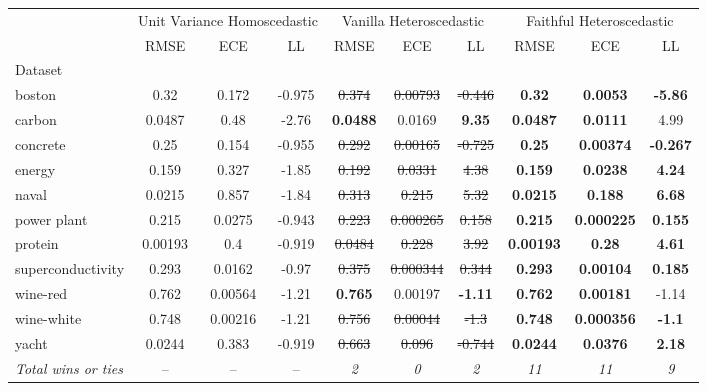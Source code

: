 \begin{tabular}{l|ccc|ccc|ccc}
\toprule
 & \multicolumn{3}{|c}{Unit Variance Homoscedastic} & \multicolumn{3}{|c}{Vanilla Heteroscedastic} & \multicolumn{3}{|c}{Faithful Heteroscedastic} \\
 & RMSE & ECE & LL & RMSE & ECE & LL & RMSE & ECE & LL \\
Dataset &  &  &  &  &  &  &  &  &  \\
\midrule
boston & 0.32 & 0.172 & -0.975 & \sout{0.374} & \sout{0.00793} & \sout{-0.446} & \textbf{0.32} & \textbf{0.0053} & \textbf{-5.86} \\
carbon & 0.0487 & 0.48 & -2.76 & \textbf{0.0488} & 0.0169 & \textbf{9.35} & \textbf{0.0487} & \textbf{0.0111} & 4.99 \\
concrete & 0.25 & 0.154 & -0.955 & \sout{0.292} & \sout{0.00165} & \sout{-0.725} & \textbf{0.25} & \textbf{0.00374} & \textbf{-0.267} \\
energy & 0.159 & 0.327 & -1.85 & \sout{0.192} & \sout{0.0331} & \sout{4.38} & \textbf{0.159} & \textbf{0.0238} & \textbf{4.24} \\
naval & 0.0215 & 0.857 & -1.84 & \sout{0.313} & \sout{0.215} & \sout{5.32} & \textbf{0.0215} & \textbf{0.188} & \textbf{6.68} \\
power plant & 0.215 & 0.0275 & -0.943 & \sout{0.223} & \sout{0.000265} & \sout{0.158} & \textbf{0.215} & \textbf{0.000225} & \textbf{0.155} \\
protein & 0.00193 & 0.4 & -0.919 & \sout{0.0484} & \sout{0.228} & \sout{3.92} & \textbf{0.00193} & \textbf{0.28} & \textbf{4.61} \\
superconductivity & 0.293 & 0.0162 & -0.97 & \sout{0.375} & \sout{0.000344} & \sout{0.344} & \textbf{0.293} & \textbf{0.00104} & \textbf{0.185} \\
wine-red & 0.762 & 0.00564 & -1.21 & \textbf{0.765} & 0.00197 & \textbf{-1.11} & \textbf{0.762} & \textbf{0.00181} & -1.14 \\
wine-white & 0.748 & 0.00216 & -1.21 & \sout{0.756} & \sout{0.00044} & \sout{-1.3} & \textbf{0.748} & \textbf{0.000356} & \textbf{-1.1} \\
yacht & 0.0244 & 0.383 & -0.919 & \sout{0.663} & \sout{0.096} & \sout{-0.744} & \textbf{0.0244} & \textbf{0.0376} & \textbf{2.18} \\
\textit{{Total wins or ties}} & -- & -- & -- & \textit{2} & \textit{0} & \textit{2} & \textit{11} & \textit{11} & \textit{9} \\
\bottomrule
\end{tabular}
